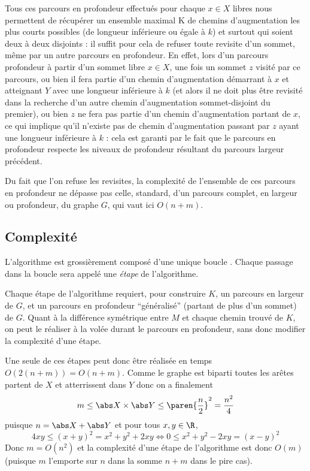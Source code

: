  Tous ces parcours en profondeur effectués pour chaque $x \in X$ libres nous permettent de récupérer un ensemble maximal K de chemins d'augmentation les plus courts possibles (de longueur inférieure ou égale à $k$) et surtout qui soient deux à deux disjoints : il suffit pour cela de refuser toute revisite d'un sommet, même par un autre parcours en profondeur. En effet, lors d'un parcours profondeur à partir d'un sommet libre $x \in X$, une fois un sommet $z$ visité par ce parcours, ou bien il fera partie d'un chemin d'augmentation démarrant à $x$ et atteignant $Y$ avec une longueur inférieure à $k$ (et alors il ne doit plus être revisité dans la recherche d'un autre chemin d'augmentation sommet-disjoint du premier), ou bien $z$ ne fera pas partie d'un chemin d'augmentation partant de $x$, ce qui implique qu'il n'existe pas de chemin d'augmentation passant par $z$ ayant une longueur inférieure à $k$ : cela est garanti par le fait que le parcours en profondeur respecte les niveaux de profondeur résultant du parcours largeur précédent.
 
 Du fait que l'on refuse les revisites, la complexité de l'ensemble de ces parcours en profondeur ne dépasse pas celle, standard, d'un parcours complet, en largeur ou profondeur, du graphe $G$, qui vaut ici $O(n + m)$.
 
 \subsection{Complexité}
 
 L'algorithme est grossièrement composé d'une unique boucle . Chaque passage dans la boucle sera appelé une \emph{étape} de l'algorithme.
 
 Chaque étape de l'algorithme requiert, pour construire $K$, un parcours en largeur de $G$, et un parcours en profondeur ``généralisé'' (partant de plus d'un sommet) de $G$. Quant à la différence symétrique entre $M$ et chaque chemin trouvé de $K$, on peut le réaliser à la volée durant le parcours en profondeur, sans donc modifier la complexité d'une étape.
 
 Une seule de ces étapes peut donc être réalisée en temps $O(2(n+m)) = O(n + m)$. Comme le graphe est biparti toutes les arêtes partent de $X$ et atterrissent dans $Y$ donc on a finalement
 \[ m \leq \abs X \times \abs Y \leq \paren{\dfrac n 2}^2 = \dfrac {n^2} 4 \]
 puisque $n = \abs X + \abs Y$ et pour tous $x,y \in \R$,
 \[4xy \leq (x + y)^2 = x^2 + y^2 + 2xy  \iff 0 \leq x^2 + y^2 - 2xy = (x - y)^2\]
 Donc $m = O(n^2)$ et la complexité d'une étape de l'algorithme est donc $O(m)$ (puisque $m$ l'emporte sur $n$ dans la somme $n + m$ dans le pire cas).
 
